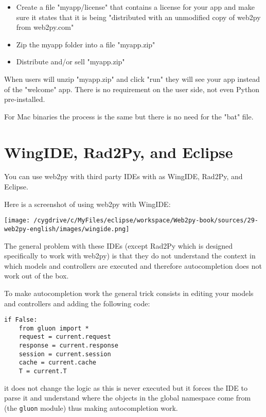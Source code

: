 \documentclass[justified,sixbynine,notoc]{tufte-book}
\def\ft{\small\tt}
\def\inxx#1{\index{#1}}
\begin{document}
\begin{fullwidth}
\begin{itemize}
\item Create a file "myapp/license" that contains a license for your app and make sure it states that it is being "distributed with an unmodified copy of web2py from web2py.com"

\item Zip the myapp folder into a file "myapp.zip"

\item Distribute and/or sell "myapp.zip"
\end{itemize}

When users will unzip "myapp.zip" and click "run" they will see your app instead of the "welcome" app.
There is no requirement on the user side, not even Python pre-installed.

For Mac binaries the process is the same but there is no need for the "bat" file.

\goodbreak\section{WingIDE, Rad2Py, and Eclipse}

\inxx{WingIDE} \inxx{Eclipse} \inxx{Rad2Py}

You can use web2py with third party IDEs with as WingIDE, Rad2Py, and Eclipse.

Here is a screenshot of using web2py with WingIDE:


\goodbreak\begin{center}\texttt{[image: /cygdrive/c/MyFiles/eclipse/workspace/Web2py-book/sources/29-web2py-english/images/wingide.png]}\end{center}


The general problem with these IDEs (except Rad2Py which is designed specifically to work with web2py) is that they do not understand the context in which models and controllers are executed and therefore autocompletion does not work out of the box.

To make autocompletion work the general trick consists in editing your models and controllers and adding the following code:

\begin{lstlisting}
if False:
    from gluon import *
    request = current.request
    response = current.response
    session = current.session
    cache = current.cache
    T = current.T
\end{lstlisting}
\noindent it does not change the logic as this is never executed but it forces the IDE to parse it and understand where the objects in the global namespace come from (the {\ft gluon} module) thus making autocompletion work.


\end{fullwidth}
\end{document}
